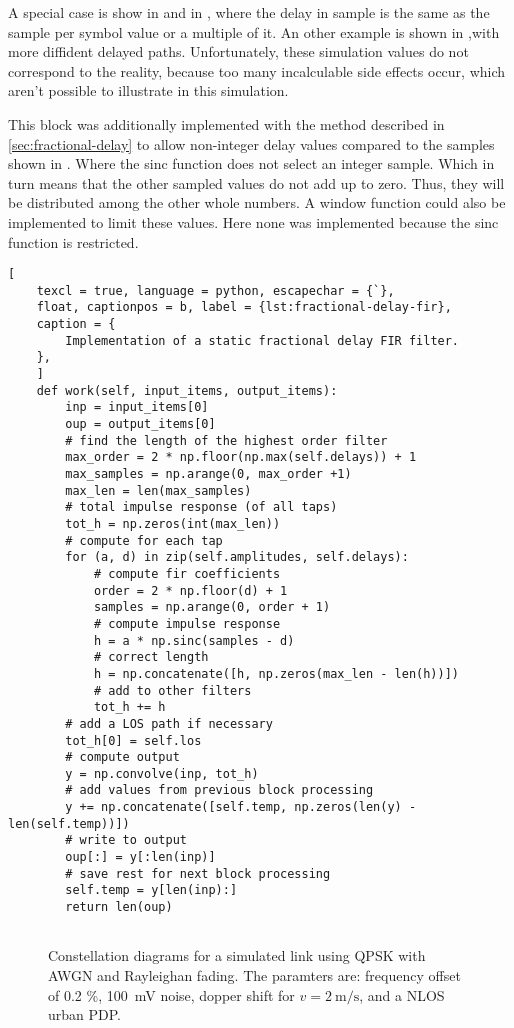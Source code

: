 A special case is show in  and in , where the delay in sample is the same as the sample per symbol value or a multiple of it. An other example is shown in ,with more diffident delayed paths.
Unfortunately, these simulation values do not correspond to the reality, because too many incalculable side effects occur, which aren't possible to illustrate in this simulation.

This block was additionally implemented with the method described in \ref{sec:fractional-delay} to allow non-integer delay values compared to the samples shown in . Where the sinc function does not select an integer sample. Which in turn means that the other sampled values do not add up to zero.
Thus, they will be distributed among the other whole numbers. A window function could also be implemented to limit these values. Here none was implemented because the sinc function is restricted.

\begin{lstlisting}[
	texcl = true, language = python, escapechar = {`},
	float, captionpos = b, label = {lst:fractional-delay-fir},
	caption = {
		Implementation of a static fractional delay FIR filter.
	},
	]
	def work(self, input_items, output_items):
		inp = input_items[0]
		oup = output_items[0]
		# find the length of the highest order filter
		max_order = 2 * np.floor(np.max(self.delays)) + 1
		max_samples = np.arange(0, max_order +1)
		max_len = len(max_samples)
		# total impulse response (of all taps)
		tot_h = np.zeros(int(max_len))
		# compute for each tap
		for (a, d) in zip(self.amplitudes, self.delays):
			# compute fir coefficients
			order = 2 * np.floor(d) + 1
			samples = np.arange(0, order + 1)
			# compute impulse response
			h = a * np.sinc(samples - d)
			# correct length
			h = np.concatenate([h, np.zeros(max_len - len(h))])
			# add to other filters
			tot_h += h
		# add a LOS path if necessary
		tot_h[0] = self.los
		# compute output
		y = np.convolve(inp, tot_h)
		# add values from previous block processing
		y += np.concatenate([self.temp, np.zeros(len(y) - len(self.temp))])
		# write to output
		oup[:] = y[:len(inp)]
		# save rest for next block processing
		self.temp = y[len(inp):]
		return len(oup)
	
\end{lstlisting}

%
%	
%
\begin{figure}
	\centering
	
	\caption{
		Constellation diagrams for a simulated link using QPSK with AWGN and Rayleighan fading. The paramters are: frequency offset of 0.2 \%, \SI{100}{\milli\volt} noise, dopper shift for \(v = \SI{2}{\meter\per\second}\), and a NLOS urban PDP.
	}
	\label{fig:dynamic-exp}
\end{figure}



